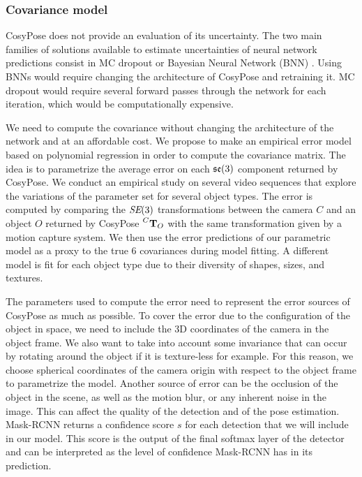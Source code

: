 \subsubsection{Covariance model}

CosyPose does not provide an evaluation of its uncertainty.
%
The two main families of solutions available to estimate uncertainties of neural network predictions consist in MC dropout \cite{gal2016dropout} 
or Bayesian Neural Network (BNN) \cite{jospin2020hands}. Using BNNs would require changing the architecture of CosyPose and retraining it. 
MC dropout would require several forward passes through the network for each iteration, which would be computationally expensive. 

We need to compute the covariance without changing the architecture of the network and at an affordable cost. 
We propose to make an empirical error model based on polynomial regression in order to compute the covariance matrix. 
The idea is to parametrize the average error on each ${\mathfrak {se}}(3)$ component returned by CosyPose. We conduct an empirical study on several video 
sequences that explore the variations of the parameter set for several object types. The error is computed by comparing the $\textit{SE}(3)$ transformations 
between the camera $C$ and an object $O$ returned by CosyPose $\prescript{C}{}{{\bf T}}_{O}$ with the same transformation given by a motion capture system. 
We then use the error predictions of our parametric model as a proxy to the true 6 covariances during model fitting. 
A different model is fit for each object type due to their diversity of shapes, sizes, and textures.

The parameters used to compute the error need to represent the error sources of CosyPose as much as possible. 
To cover the error due to the configuration of the object in space, we need to include the 3D coordinates of the camera in the object frame. 
We also want to take into account some invariance that can occur by rotating around the object if it is texture-less for example. 
For this reason, we choose spherical coordinates of the camera origin with respect to the object frame to parametrize the model. 
Another source of error can be the occlusion of the object in the scene, as well as the motion blur, or any inherent noise in the image. 
This can affect the quality of the detection and of the pose estimation. Mask-RCNN returns a confidence score $s$ for each detection 
that we will include in our model. This score is the output of the final softmax layer of the detector and can be interpreted
as the level of confidence Mask-RCNN has in its prediction.

